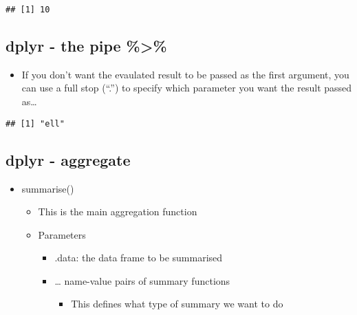 \documentclass[]{article}
\newenvironment{Shaded}{\begin{snugshade}}{\end{snugshade}}
\newcommand{\KeywordTok}[1]{\textcolor[rgb]{0.13,0.29,0.53}{\textbf{#1}}}
\newcommand{\DecValTok}[1]{\textcolor[rgb]{0.00,0.00,0.81}{#1}}
\newcommand{\StringTok}[1]{\textcolor[rgb]{0.31,0.60,0.02}{#1}}
\newcommand{\OperatorTok}[1]{\textcolor[rgb]{0.81,0.36,0.00}{\textbf{#1}}}
\newcommand{\NormalTok}[1]{#1}
\providecommand{\tightlist}{%
  \setlength{\itemsep}{0pt}\setlength{\parskip}{0pt}}
\begin{document}
\begin{verbatim}
## [1] 10
\end{verbatim}

\subsection{dplyr - the pipe
\%\textgreater{}\%}\label{dplyr---the-pipe-2}

\begin{itemize}
\tightlist
\item
  If you don't want the evaulated result to be passed as the first
  argument, you can use a full stop (``.'') to specify which parameter
  you want the result passed as\ldots{}
\end{itemize}

\begin{Shaded}
\end{Shaded}

\begin{verbatim}
## [1] "ell"
\end{verbatim}

\subsection{dplyr - aggregate}\label{dplyr---aggregate}

\begin{itemize}
\tightlist
\item
  summarise()

  \begin{itemize}
  \tightlist
  \item
    This is the main aggregation function
  \item
    Parameters

    \begin{itemize}
    \tightlist
    \item
      .data: the data frame to be summarised
    \item
      \ldots{} name-value pairs of summary functions

      \begin{itemize}
      \tightlist
      \item
        This defines what type of summary we want to do
      \end{itemize}
    \end{itemize}
  \end{itemize}
\end{itemize}
\end{document}
